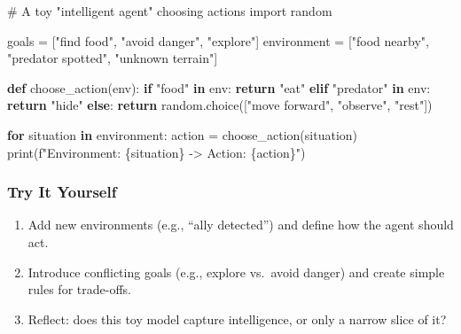 \documentclass[
  letterpaper,
  DIV=11,
  numbers=noendperiod]{scrreprt}
\newenvironment{Shaded}{\begin{snugshade}}{\end{snugshade}}
\newcommand{\BuiltInTok}[1]{\textcolor[rgb]{0.00,0.23,0.31}{#1}}
\newcommand{\CommentTok}[1]{\textcolor[rgb]{0.37,0.37,0.37}{#1}}
\newcommand{\ControlFlowTok}[1]{\textcolor[rgb]{0.00,0.23,0.31}{\textbf{#1}}}
\newcommand{\ImportTok}[1]{\textcolor[rgb]{0.00,0.46,0.62}{#1}}
\newcommand{\KeywordTok}[1]{\textcolor[rgb]{0.00,0.23,0.31}{\textbf{#1}}}
\newcommand{\NormalTok}[1]{\textcolor[rgb]{0.00,0.23,0.31}{#1}}
\newcommand{\OperatorTok}[1]{\textcolor[rgb]{0.37,0.37,0.37}{#1}}
\newcommand{\SpecialCharTok}[1]{\textcolor[rgb]{0.37,0.37,0.37}{#1}}
\newcommand{\SpecialStringTok}[1]{\textcolor[rgb]{0.13,0.47,0.30}{#1}}
\newcommand{\StringTok}[1]{\textcolor[rgb]{0.13,0.47,0.30}{#1}}
\providecommand{\tightlist}{%
  \setlength{\itemsep}{0pt}\setlength{\parskip}{0pt}}
\begin{document}
\begin{Shaded}
\begin{Highlighting}[]
\CommentTok{\# A toy "intelligent agent" choosing actions}
\ImportTok{import}\NormalTok{ random}

\NormalTok{goals }\OperatorTok{=}\NormalTok{ [}\StringTok{"find food"}\NormalTok{, }\StringTok{"avoid danger"}\NormalTok{, }\StringTok{"explore"}\NormalTok{]}
\NormalTok{environment }\OperatorTok{=}\NormalTok{ [}\StringTok{"food nearby"}\NormalTok{, }\StringTok{"predator spotted"}\NormalTok{, }\StringTok{"unknown terrain"}\NormalTok{]}

\KeywordTok{def}\NormalTok{ choose\_action(env):}
    \ControlFlowTok{if} \StringTok{"food"} \KeywordTok{in}\NormalTok{ env:}
        \ControlFlowTok{return} \StringTok{"eat"}
    \ControlFlowTok{elif} \StringTok{"predator"} \KeywordTok{in}\NormalTok{ env:}
        \ControlFlowTok{return} \StringTok{"hide"}
    \ControlFlowTok{else}\NormalTok{:}
        \ControlFlowTok{return}\NormalTok{ random.choice([}\StringTok{"move forward"}\NormalTok{, }\StringTok{"observe"}\NormalTok{, }\StringTok{"rest"}\NormalTok{])}

\ControlFlowTok{for}\NormalTok{ situation }\KeywordTok{in}\NormalTok{ environment:}
\NormalTok{    action }\OperatorTok{=}\NormalTok{ choose\_action(situation)}
    \BuiltInTok{print}\NormalTok{(}\SpecialStringTok{f"Environment: }\SpecialCharTok{\{}\NormalTok{situation}\SpecialCharTok{\}}\SpecialStringTok{ {-}\textgreater{} Action: }\SpecialCharTok{\{}\NormalTok{action}\SpecialCharTok{\}}\SpecialStringTok{"}\NormalTok{)}
\end{Highlighting}
\end{Shaded}

\subsubsection{Try It Yourself}\label{try-it-yourself}

\begin{enumerate}
\def\labelenumi{\arabic{enumi}.}
\tightlist
\item
  Add new environments (e.g., ``ally detected'') and define how the
  agent should act.
\item
  Introduce conflicting goals (e.g., explore vs.~avoid danger) and
  create simple rules for trade-offs.
\item
  Reflect: does this toy model capture intelligence, or only a narrow
  slice of it?
\end{enumerate}
\end{document}
